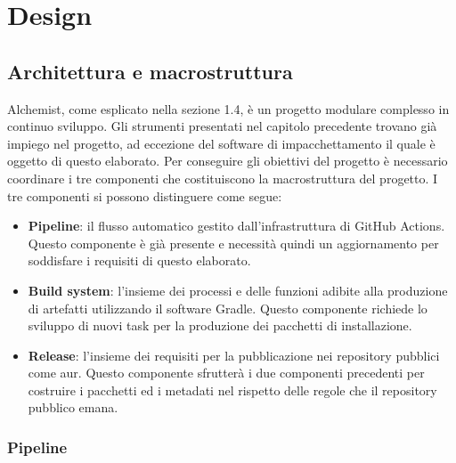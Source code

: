 \chapter{Design}

\section{Architettura e macrostruttura}

Alchemist, come esplicato nella sezione 1.4, è un progetto modulare complesso in continuo sviluppo. Gli strumenti presentati nel capitolo precedente trovano già impiego nel progetto, ad eccezione del software di impacchettamento il quale è oggetto di questo elaborato. Per conseguire gli obiettivi del progetto è necessario coordinare i tre componenti che costituiscono la macrostruttura del progetto. I tre componenti si possono distinguere come segue:
\begin{itemize}
	\item \textbf{Pipeline}: il flusso automatico gestito dall'infrastruttura di GitHub Actions. Questo componente è già presente e necessità quindi un aggiornamento per soddisfare i requisiti di questo elaborato.
	\item \textbf{Build system}: l'insieme dei processi e delle funzioni adibite alla produzione di artefatti utilizzando il software Gradle. Questo componente richiede lo sviluppo di nuovi task per la produzione dei pacchetti di installazione.
	\item \textbf{Release}: l'insieme dei requisiti per la pubblicazione nei repository pubblici come \ac{aur}. Questo componente sfrutterà i due componenti precedenti per costruire i pacchetti ed i metadati nel rispetto delle regole che il repository pubblico emana.
\end{itemize}

\subsection{Pipeline}


